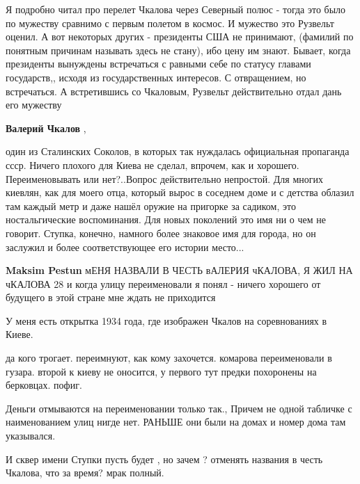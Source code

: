 \begin{itemize}

Я подробно читал про перелет Чкалова через Северный полюс - тогда это было по
мужеству сравнимо с первым полетом в космос. И мужество это Рузвельт оценил. А
вот некоторых других - президенты США не принимают, (фамилий по понятным
причинам называть здесь не стану), ибо цену им знают. Бывает, когда президенты
вынуждены встречаться с равными себе по статусу главами государств,, исходя из
государственных интересов. С отвращением, но встречаться. А встретившись со
Чкаловым, Рузвельт действительно отдал дань его мужеству

\textbf{Валерий Чкалов} , 

один из Сталинских Соколов, в которых так нуждалась официальная пропаганда
ссср. Ничего плохого для Киева не сделал, впрочем, как и хорошего.
Переименовывать или нет?..Вопрос действительно непростой. Для многих киевлян,
как для моего отца, который вырос в соседнем доме и с детства облазил там
каждый метр и даже нашёл оружие на пригорке за садиком, это ностальгические
воспоминания. Для новых поколений это имя ни о чем не говорит. Ступка, конечно,
намного более знаковое имя для города, но он заслужил и более соответствующее
его истории место...

\begin{itemize} %
\textbf{Maksim Pestun} мЕНЯ НАЗВАЛИ В ЧЕСТЬ вАЛЕРИЯ чКАЛОВА, Я ЖИЛ НА чКАЛОВА 28 и когда улицу переименовали я понял - ничего хорошего от будущего в этой стране мне ждать не приходится
\end{itemize} %

У меня есть открытка 1934 года, где изображен Чкалов на соревнованиях в Киеве.


да кого трогает. переимнуют, как кому захочется.  комарова переименовали в
гузара. второй к киеву не оносится, у первого тут предки похоронены на
берковцах. пофиг.


Деньги отмываются на переименовании только так., Причем не одной табличке с
наименованием улиц нигде нет. РАНЬШЕ они были на домах и номер дома там
указывался.


И сквер имени Ступки пусть будет , но зачем ? отменять названия в честь
Чкалова, что за время? мрак полный.



\end{itemize}
